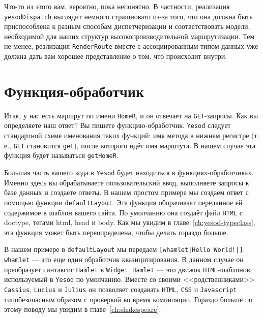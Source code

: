 Что-то из этого вам, вероятно, пока непонятно. В частности, реализация
\lstinline!yesodDispatch! выглядит немного страшновато из-за того, что она должна быть
приспособлена к разным способам диспетчеризации и соответствовать модели, необходимой для
наших структур высокопроизводительной маршрутизации. Тем не менее, реализация
\lstinline!RenderRoute! вместе с ассоциированным типом данных уже должна дать вам хорошее
представление о том, что происходит внутри.

\section{Функция-обработчик}

Итак, у нас есть маршрут по имени \lstinline!HomeR!, и он отвечает на
\texttt{GET}-запросы.  Как вы определяете наш ответ? Вы пишете
функцию-обработчик. \texttt{Yesod} следует стандартной схеме именования таких функций: имя
метода в нижнем регистре (т. е., \texttt{GET} становится \lstinline!get!), после которого
идёт имя марштута. В нашем случае эта функция будет называться \lstinline!getHomeR!.

Большая часть вашего кода в \texttt{Yesod} будет находиться в функциях-обработчиках.
Именно здесь вы обрабатываете пользовательский ввод, выполняете запросы к базе данных и
создаете ответы. В нашем простом примере мы создаем ответ с помощью функции
\lstinline!defaultLayout!. Эта функция оборачивает переданное ей содержимое в шаблон
вашего сайта. По умолчанию она создаёт файл \texttt{HTML} с doctype, тегами html, head и
body. Как мы увидим в главе~\ref{ch:yesod-typeclass}, эта функция может быть
переопределена, чтобы делать гораздо больше.

В нашем примере в \lstinline!defaultLayout! мы передаем \lstinline'[whamlet|Hello
World!|]'. \lstinline!whamlet! --- это еще один обработчик квазицитирования. В данном
случае он преобразует синтаксис \texttt{Hamlet} в \texttt{Widget}. \texttt{Hamlet} --- это
движок \texttt{HTML}-шаблонов, используемый в \texttt{Yesod} по умолчанию.  Вместе со
своими <<родственниками>> \texttt{Cassius}, \texttt{Lucius} и \texttt{Julius} он позволяет
создавать \texttt{HTML}, \texttt{CSS} и \texttt{Javascript} типобезопасным образом с
проверкой во время компиляции. Гораздо больше по этому поводу мы увидим в
главе~\ref{ch:shakespeare}.

